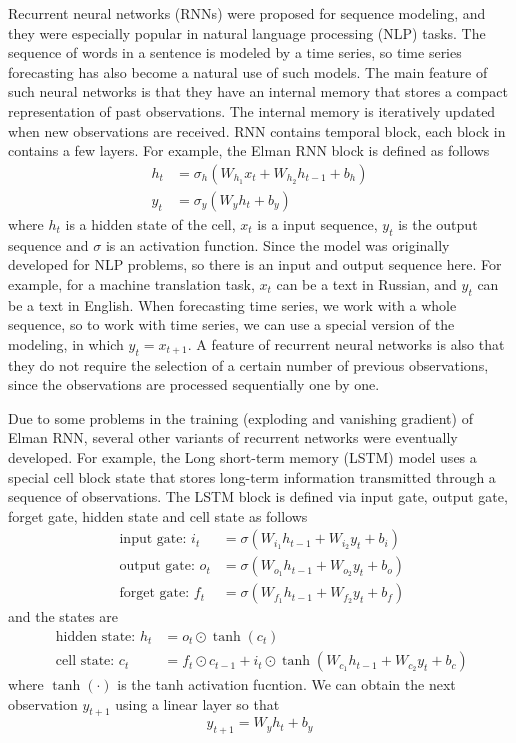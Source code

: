 \documentclass[12pt,a4paper]{article}
\begin{document}
Recurrent neural networks (RNNs) were proposed for sequence modeling, and they were especially popular in natural language processing (NLP) tasks. The sequence of words in a sentence is modeled by a time series, so time series forecasting has also become a natural use of such models. The main feature of such neural networks is that they have an internal memory that stores a compact representation of past observations. The internal memory is iteratively updated when new observations are received. RNN contains temporal block, each block in contains a few layers. For example, the Elman RNN block is defined as follows
$$
\begin{aligned}
    h_{t} &=\sigma_{h}\left(W_{h_1} x_{t}+W_{h_2} h_{t-1}+b_{h}\right) \\
    y_{t} &=\sigma_{y}\left(W_{y} h_{t}+b_{y}\right)
\end{aligned}
$$
where $h_t$ is a hidden state of the cell, $x_t$ is a input sequence, $y_t$ is the output sequence and $\sigma$ is an activation function. Since the model was originally developed for NLP problems, so there is an input and output sequence here. For example, for a machine translation task, $x_t$ can be a text in Russian, and $y_t$ can be a text in English. When forecasting time series, we work with a whole sequence, so to work with time series, we can use a special version of the modeling, in which $y_t = x_{t+1}$. A feature of recurrent neural networks is also that they do not require the selection of a certain number of previous observations, since the observations are processed sequentially one by one.

Due to some problems in the training (exploding and vanishing gradient) of Elman RNN, several other variants of recurrent networks were eventually developed. For example, the Long short-term memory (LSTM) model uses a special cell block state that stores long-term information transmitted through a sequence of observations. The LSTM block is defined via input gate, output gate, forget gate, hidden state and cell state as follows
$$
\begin{aligned}
\text { input gate: } {i}_{t} &=\sigma\left({W}_{i_{1}} {h}_{t-1}+{W}_{i_{2}} y_{t}+{b}_{i}\right) \\
\text { output gate: } {o}_{t} &=\sigma\left({W}_{o_{1}} {h}_{t-1}+{W}_{o_{2}} y_{t}+{b}_{o}\right) \\
\text { forget gate: } {f}_{t} &=\sigma\left({W}_{f_{1}} {h}_{t-1}+{W}_{f_{2}} y_{t}+{b}_{f}\right)
\end{aligned}
$$
and the states are
$$
\begin{aligned}
\text { hidden state: } h_{t} &=o_{t} \odot \tanh \left(c_{t}\right) \\
\text { cell state: } c_{t} &=f_{t} \odot c_{t-1}+i_{t} \odot \tanh \left(W_{c_{1}} h_{t-1}+W_{c_{2}} y_{t}+b_{c}\right)
\end{aligned}
$$
where $\tanh(\cdot)$ is the tanh activation fucntion. We can obtain the next observation $y_{t+1}$ using a linear layer so that
$$y_{t+1} = W_y h_{t} + b_y$$
\end{document}
